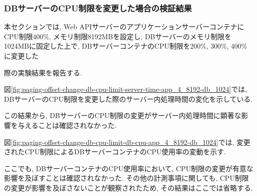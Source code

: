 \documentclass[../../../../main]{subfiles}
\begin{document}
    \subsubsection{DBサーバーのCPU制限を変更した場合の検証結果}\label{subsubsec:result-paging-offset-change-db-cpu}

    本セクションでは, Web APIサーバーのアプリケーションサーバーコンテナにCPU制限400\%, メモリ制限8192MBを設定し, DBサーバーのメモリ制限を1024MBに固定した上で, DBサーバーコンテナのCPU制限を200\%, 300\%, 400\%に変更した

    際の実験結果を報告する.


    図\ref{fig:paging-offset-change-db-cpu-limit-server-time-app_4_8192-db_1024}では, DBサーバーのCPU制限を変更した際のサーバー内処理時間の変化を示している.

    

    この結果から, DBサーバーのCPU制限の変更がサーバー内処理時間に顕著な影響を与えることは確認されなかった.


    図\ref{fig:paging-offset-change-db-cpu-limit-db-cpu-app_4_8192-db_1024}では, 変更されたCPU制限によるDBサーバーコンテナのCPU使用率の変動を示す.

    

    ここでも, DBサーバーコンテナのCPU使用率において, CPU制限の変更が有意な影響を及ぼすことは確認されなかった. その他の計測事項に関しても, CPU制限の変更が影響を及ぼさないことが観察されたため, その結果はここでは省略する.
\end{document}
